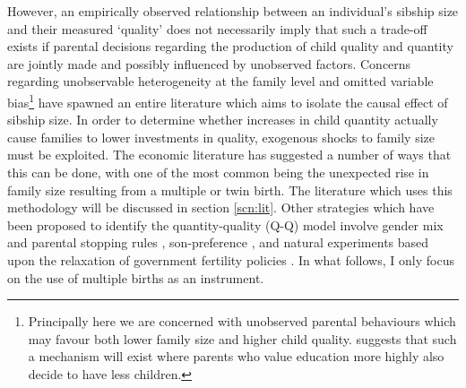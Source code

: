 \documentclass{article}[11pt,subeqn]
\begin{document}
\begin{spacing}{1.5}
However, an empirically observed relationship between an individual's sibship size and their measured `quality' does not necessarily imply that such a trade-off 
exists if parental decisions regarding the production of child quality and quantity are jointly made and possibly influenced by unobserved factors.  Concerns 
regarding unobservable heterogeneity at the family level and omitted variable bias\footnote{Principally here we are concerned with unobserved parental 
behaviours which may favour both lower family size and higher child quality.  \citet{Qian2009} suggests that such a mechanism will exist where parents who 
value education more highly also decide to have less children.} have spawned an entire literature which aims to isolate the causal effect of sibship size.  In 
order to determine whether increases in child quantity actually cause families to lower investments in quality, exogenous shocks to family size must be exploited.  
The economic literature has suggested a number of ways that this can be done, with one of the most common being the unexpected rise in family size resulting 
from a multiple or twin birth.  The literature which uses this methodology will be discussed in section \ref{scn:lit}.  Other strategies which have been 
proposed to identify the quantity-quality (Q-Q) model involve gender mix and parental stopping rules \citep{ConleyGlauber2006}, son-preference \citep{Lee2008}, 
and natural experiments based upon the relaxation of government fertility policies \citep{Qian2009}.   In what follows, I only focus on the use of multiple 
births as an instrument.


\end{spacing}
\end{document}
